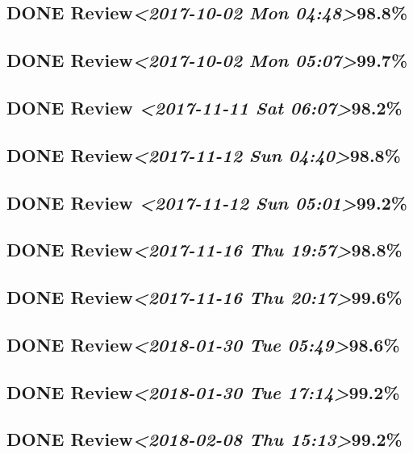 \documentclass[11pt]{ctexart}
\begin{document}
\subsection{{\bfseries\sffamily DONE} Review\textit{<2017-10-02 Mon 04:48>}98.8\%}
\label{sec:orgfa867b9}
\subsection{{\bfseries\sffamily DONE} Review\textit{<2017-10-02 Mon 05:07>}99.7\%}
\label{sec:orgeacc2c0}

\subsection{{\bfseries\sffamily DONE} Review \textit{<2017-11-11 Sat 06:07>}98.2\%}
\label{sec:org07ca4ca}

\subsection{{\bfseries\sffamily DONE} Review\textit{<2017-11-12 Sun 04:40>}98.8\%}
\label{sec:org87f302e}
\subsection{{\bfseries\sffamily DONE} Review \textit{<2017-11-12 Sun 05:01>}99.2\%}
\label{sec:org547e275}
\subsection{{\bfseries\sffamily DONE} Review\textit{<2017-11-16 Thu 19:57>}98.8\%}
\label{sec:orgf6d78cf}
\subsection{{\bfseries\sffamily DONE} Review\textit{<2017-11-16 Thu 20:17>}99.6\%}
\label{sec:org95885db}
\subsection{{\bfseries\sffamily DONE} Review\textit{<2018-01-30 Tue 05:49>}98.6\%}
\label{sec:org3072ef7}
\subsection{{\bfseries\sffamily DONE} Review\textit{<2018-01-30 Tue 17:14>}99.2\%}
\label{sec:org9e7f0ee}
\subsection{{\bfseries\sffamily DONE} Review\textit{<2018-02-08 Thu 15:13>}99.2\%}
\label{sec:orgb007a93}
\end{document}
